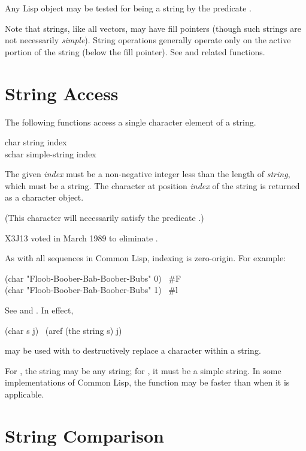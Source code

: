 Any Lisp object may be tested for being a string by
the predicate .

Note that strings, like all vectors, may have fill pointers
(though such strings are not necessarily \emph{simple}).
String operations generally operate only on the active portion of the string
(below the fill pointer).  See  and related
functions.

\section{String Access}

The following functions access a single character element of a string.

\begin{defun}[Function]
char string index \\
schar simple-string index

The given \emph{index} must be a non-negative integer less than
the length of \emph{string}, which must be a
string.  The character at position \emph{index}
of the string is returned as a character object.
\begin{obsolete}
(This character will necessarily satisfy the predicate .)
\end{obsolete}
\begin{newer}
X3J13 voted in March 1989 
to eliminate .
\end{newer}
As with all sequences in Common Lisp, indexing is zero-origin.
For example:
\begin{lisp}
(char "Floob-Boober-Bab-Boober-Bubs" 0) \EV\ \#{\Xbackslash}F \\
(char "Floob-Boober-Bab-Boober-Bubs" 1) \EV\ \#{\Xbackslash}l
\end{lisp}
See  and .  In effect,
\begin{lisp}
(char s j) \EQ\ (aref (the string s) j)
\end{lisp}
 may be used with  to destructively replace
a character within a string.

For , the string may be any string;
for , it must be a simple string.
In some implementations of Common Lisp, the function  may
be faster than  when it is applicable.
\end{defun}

\section{String Comparison}

